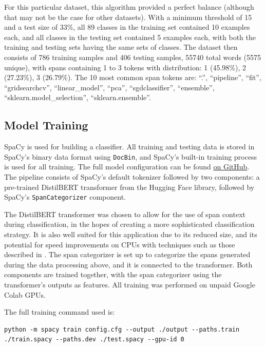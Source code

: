\documentclass[manuscript,screen,review]{acmart}
\begin{document}
For this particular dataset, this algorithm provided a perfect balance
(although that may not be the case for other datasets). With a minimum
threshold of 15 and a test size of 33\%, all 89 classes in the training
set contained 10 examples each, and all classes in the testing set
contained 5 examples each, with both the training and testing sets
having the same sets of classes. The dataset then consists of 786
training samples and 406 testing samples, 55740 total words (5575
unique), with spans containing 1 to 3 tokens with distribution: 1
(45.98\%), 2 (27.23\%), 3 (26.79\%). The 10 most common span tokens are:
``.'', ``pipeline'', ``fit'', ``gridsearchcv'', ``linear\_model'', ``pca'',
``sgdclassifier'', ``ensemble'', ``sklearn.model\_selection'',
``sklearn.ensemble''.

\subsection*{Model Training}
\label{sec:org4c1a630}

SpaCy \citep{spacy} is used for building a classifier. All training
and testing data is stored in SpaCy's binary data format using \texttt{DocBin},
and SpaCy's built-in training process is used for all training. The
full model configuration can be found \href{https://github.com/rynoV/CPSC-599-NLP-project/blob/master/config.cfg}{on GitHub}. The pipeline consists
of SpaCy's default tokenizer followed by two components: a pre-trained
DistilBERT transformer \citep{distilbert} from the Hugging Face
\citep{hugging-face} library, followed by SpaCy's \texttt{SpanCategorizer}
component.

The DistilBERT transformer was chosen to allow for the use of span
context during classification, in the hopes of creating a more
sophisticated classification strategy. It is also well suited for this
application due to its reduced size, and its potential for speed
improvements on CPUs with techniques such as those described in
\citeauthor{fastdistilbert}. The span categorizer is set up to
categorize the spans generated during the data processing above, and
it is connected to the transformer. Both components are trained
together, with the span categorizer using the transformer's outputs as
features. All training was performed on unpaid Google Colab GPUs.

The full training command used is:

\begin{verbatim}
python -m spacy train config.cfg --output ./output --paths.train ./train.spacy --paths.dev ./test.spacy --gpu-id 0
\end{verbatim}
\end{document}
